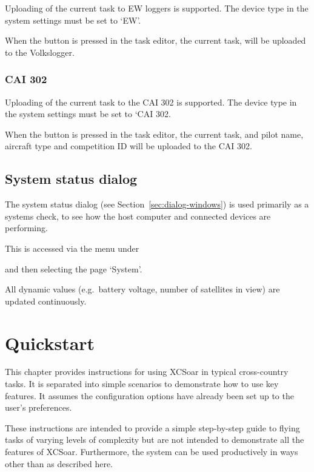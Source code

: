 \documentclass[a4paper,12pt]{refrep}
\begin{document}
Uploading of the current task to EW loggers is supported.  The
device type in the system settings must be set to `EW'.

When the  button is pressed in the task editor, the
current task, will be uploaded to the Volkslogger.

\subsection*{CAI 302}

Uploading of the current task to the CAI 302 is supported.  The device
type in the system settings must be set to `CAI 302.

When the  button is pressed in the task editor, the
current task, and pilot name, aircraft type and competition ID will be
uploaded to the CAI 302.


\section{System status dialog}\label{sec:system-status-dialog}

The system status dialog (see Section~\ref{sec:dialog-windows}) is
used primarily as a systems check, to see how the host computer and
connected devices are performing.

This is accessed via the menu under 
\begin{quote}
\blink{}\blink{}
\end{quote}
and then selecting the page `System'.

All dynamic values (e.g.\ battery voltage, number of satellites in
view) are updated continuously.

\chapter{Quickstart}\label{cha:quickstart}

This chapter provides instructions for using XCSoar in typical
cross-country tasks.  It is separated into simple scenarios to
demonstrate how to use key features.  It assumes the configuration
options have already been set up to the user's preferences.

These instructions are intended to provide a simple step-by-step guide
to flying tasks of varying levels of complexity but are not intended
to demonstrate all the features of XCSoar.  Furthermore, the system
can be used productively in ways other than as described here.
\end{document}
